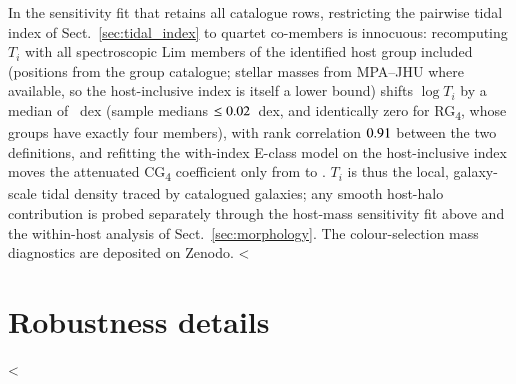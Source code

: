 \documentclass{aa}
\newcommand{\CG}{CG\textsubscript{4}}
\newcommand{\RG}{RG\textsubscript{4}}
\begin{document}
\begin{appendix}
In the sensitivity fit that retains all catalogue rows, restricting the pairwise tidal index of Sect.~\ref{sec:tidal_index} to quartet co-members is innocuous: recomputing \(T_i\) with all spectroscopic Lim members of the identified host group included (positions from the group catalogue; stellar masses from MPA--JHU where available, so the host-inclusive index is itself a lower bound) shifts \(\log T_i\) by a median of \dTall~dex (sample medians \(\le 0.02\)~dex, and identically zero for \RG{}, whose groups have exactly four members), with rank correlation \(0.91\) between the two definitions, and refitting the with-index E-class model on the host-inclusive index moves the attenuated \CG{} coefficient only from \ORresid{} to \ORresidAll{}. \(T_i\) is thus the local, galaxy-scale tidal density traced by catalogued galaxies; any smooth host-halo contribution is probed separately through the host-mass sensitivity fit above and the within-host analysis of Sect.~\ref{sec:morphology}. The colour-selection mass diagnostics are deposited on Zenodo.
<%

\raggedbottom
\section{Robustness details}\label{app:robustness_details}
\begingroup
\patchcmd{\paragraph}{-16dd}{-12dd}{}{}

<%

\end{appendix}
\end{document}
